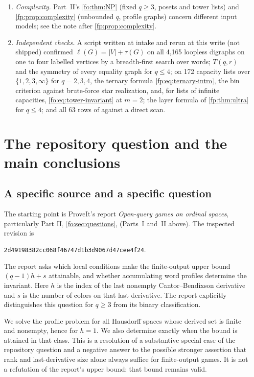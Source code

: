 \documentclass[11pt,letterpaper]{article}
\numberwithin{equation}{section}
\theoremstyle{definition}
\theoremstyle{remark}
\theoremstyle{definition}
\begin{document}
\begin{enumerate}
of Part~II's supersequence representation (\cref{fo:thm:chains}).
\item \emph{Complexity.} Part~II's \cref{fo:thm:NP} (fixed $q\ge3$, posets and
tower lists) and \cref{fp:prop:complexity} (unbounded $q$, profile graphs)
concern different input models; see the note after
\cref{fp:prop:complexity}.
\item \emph{Independent checks.} A script written at intake and rerun at this
write (not shipped) confirmed $\ell(G)=\lvert V\rvert+\tau(G)$ on all 4,165
loopless digraphs on one to four labelled vertices by a breadth-first search
over words; $T(q,r)$ and the symmetry of every equality graph for $q\le4$;
on 172 capacity lists over $\{1,2,3,\infty\}$ for $q=2,3,4$, the ternary
formula \eqref{fp:eq:ternary-intro}, the bin criterion against brute-force
star realization, and, for lists of infinite capacities,
\eqref{fo:eq:tower-invariant} at $m=2$; the layer formula of
\cref{fp:thm:ultra} for $q\le4$; and all 63 rows of
 against a direct
scan.
\end{enumerate}

\section{The repository question and the main conclusions}
\label{fp:sec:intro}

\subsection{A specific source and a specific question}

The starting point is ProveIt's report \emph{Open-query games on ordinal
spaces}, particularly Part II, \cref{fo:sec:questions}, 
(Parts~I and~II above). The inspected revision is
\begin{center}
\texttt{2d49198382cc068f46747d1b3d9067d47cee4f24}.
\end{center}
The report asks which local conditions make the finite-output upper bound
\((q-1)h+s\) attainable, and whether accumulating word profiles determine
the invariant. Here \(h\) is the index of the last nonempty
Cantor--Bendixson derivative and \(s\) is the number of colors on that
last derivative. The report explicitly distinguishes this question for
\(q\geq 3\) from its binary classification.

We solve the profile problem for all Hausdorff spaces whose derived set is
finite and nonempty, hence for \(h=1\). We also determine exactly when the
bound is attained in that class. This is a resolution of a substantive
special case of the repository question and a negative answer to the
possible stronger assertion that rank and last-derivative size alone always
suffice for finite-output games. It is not a refutation of the report's
upper bound: that bound remains valid.
\end{document}
